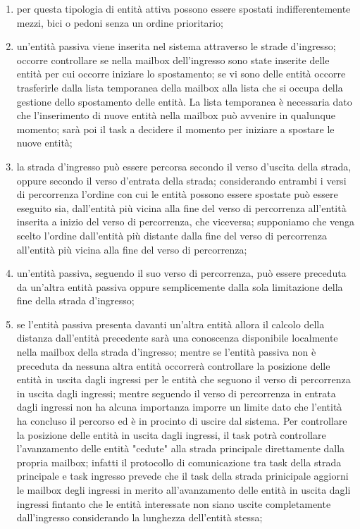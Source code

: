 \begin{enumerate}
\item per questa tipologia di entità attiva possono essere spostati indifferentemente mezzi, bici o pedoni senza un ordine prioritario;
\item un'entità passiva viene inserita nel sistema attraverso le strade d'ingresso; occorre controllare se nella mailbox dell'ingresso sono state inserite delle entità per cui occorre iniziare lo spostamento; se vi sono delle entità occorre trasferirle dalla lista temporanea della mailbox alla lista che si occupa della gestione dello spostamento delle entità. La lista temporanea è necessaria dato che l'inserimento di nuove entità nella mailbox può avvenire in qualunque momento; sarà poi il task a decidere il momento per iniziare a spostare le nuove entità;
\item la strada d'ingresso può essere percorsa secondo il verso d'uscita della strada, oppure secondo il verso d'entrata della strada; considerando entrambi i versi di percorrenza l'ordine con cui le entità possono essere spostate può essere eseguito sia, dall'entità più vicina alla fine del verso di percorrenza all'entità inserita a inizio del verso di percorrenza, che viceversa; supponiamo che venga scelto l'ordine dall'entità più distante dalla fine del verso di percorrenza all'entità più vicina alla fine del verso di percorrenza;
\item un'entità passiva, seguendo il suo verso di percorrenza, può essere preceduta da un'altra entità passiva oppure semplicemente dalla sola limitazione della fine della strada d'ingresso;
\item se l'entità passiva presenta davanti un'altra entità allora il calcolo della distanza dall'entità precedente sarà una conoscenza disponibile localmente nella mailbox della strada d'ingresso; mentre se l'entità passiva non è preceduta da nessuna altra entità occorrerà controllare la posizione delle entità in uscita dagli ingressi per le entità che seguono il verso di percorrenza in uscita dagli ingressi; mentre seguendo il verso di percorrenza in entrata dagli ingressi non ha alcuna importanza imporre un limite dato che l'entità ha concluso il percorso ed è in procinto di uscire dal sistema.
Per controllare la posizione delle entità in uscita dagli ingressi, il task potrà controllare l'avanzamento delle entità "cedute" alla strada principale direttamente dalla propria mailbox; infatti il protocollo di comunicazione tra task della strada principale e task ingresso prevede che il task della strada prinicipale aggiorni le mailbox degli ingressi in merito all'avanzamento delle entità in uscita dagli ingressi fintanto che le entità interessate non siano uscite completamente dall'ingresso considerando la lunghezza dell'entità stessa;

\end{enumerate}
